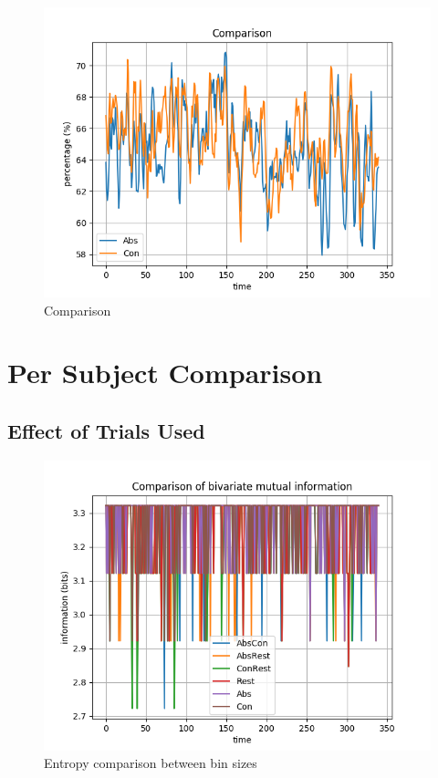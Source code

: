\begin{figure}[!htb]
\caption{Comparison}
\label{comp-1}
    \centering
    \includegraphics[width=\textwidth]{fig/comp-1}
\end{figure}

\section{Per Subject Comparison}
\subsection{Effect of Trials Used}

\begin{figure}[!htb]
\caption{Entropy comparison between bin sizes}
\label{10-trials}
    \centering
    \includegraphics[width=\textwidth]{fig/subject1_10trials_all-channel-1}
\end{figure}

